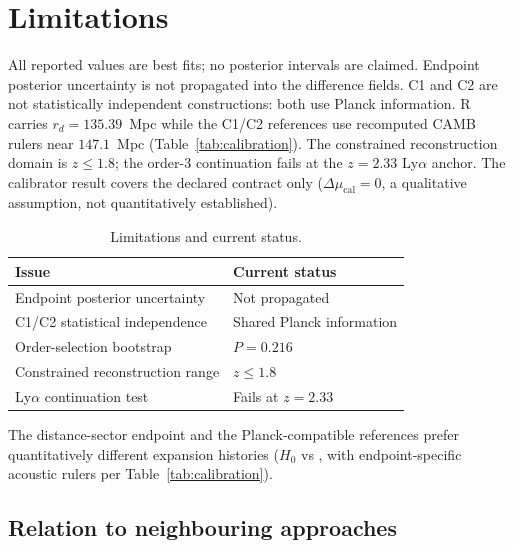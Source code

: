 \section{Limitations}
\label{sec:limitations}

All reported values are best fits; no posterior intervals are claimed. Endpoint posterior uncertainty is not propagated into the difference fields. C1 and C2 are not statistically independent constructions: both use Planck information. R carries $r_{d}=135.39$~Mpc while the C1/C2 references use recomputed CAMB rulers near $147.1$~Mpc (Table~\ref{tab:calibration}). The constrained reconstruction domain is $z\le1.8$; the order-3 continuation fails at the $z=2.33$ Ly$\alpha$ anchor. The calibrator result covers the declared contract only ($\Delta\mu_{\mathrm{cal}} = 0$, a qualitative assumption, not quantitatively established).

\begin{table}[!htbp]
  \centering
  \caption{Limitations and current status.}
  \label{tab:limitations}
  \begin{tabular}{ll}
    \toprule
    Issue & Current status \\
    \midrule
    Endpoint posterior uncertainty & Not propagated \\
    C1/C2 statistical independence & Shared Planck information \\
    Order-selection bootstrap & $P = 0.216$ \\
    Constrained reconstruction range & $z \le 1.8$ \\
    Ly$\alpha$ continuation test & Fails at $z = 2.33$ \\
    \bottomrule
  \end{tabular}
\end{table}

The distance-sector endpoint and the Planck-compatible
references prefer quantitatively different expansion histories
($H_{0}$ \DistanceHZero{} vs \CmbOneHZero{}, with endpoint-specific
acoustic rulers per Table~\ref{tab:calibration}).

\subsection{Relation to neighbouring approaches}
\label{sec:literature}

